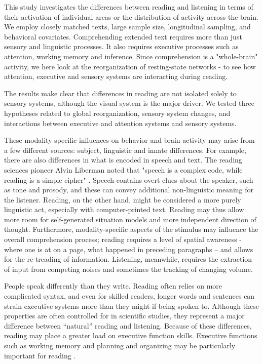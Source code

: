 This study investigates the differences between reading and listening in terms of their activation of individual areas or the distribution of activity across the brain. We employ closely matched texts, large sample size, longitudinal sampling, and behavioral covariates. Comprehending extended text requires more than just sensory and linguistic processes. It also requires executive processes such as attention, working memory and inference. Since comprehension is a "whole-brain" activity, we here look at the reorganization of resting-state networks - to see how attention, executive and sensory systems are interacting during reading.

The results make clear that differences in reading are not isolated solely to sensory systems, although the visual system is the major driver. We tested three hypotheses related to global reorganization, sensory system changes, and interactions between executive and attention systems and sensory systems.

These modality-specific influences on behavior and brain activity may arise from a few different sources: subject, linguistic and innate differences. For example, there are also differences in what is encoded in speech and text. The reading sciences pioneer Alvin Liberman noted that "speech is a complex code, while reading is a simple cipher" \cite{Mattingly1971}. Speech contains overt clues about the speaker, such as tone and prosody, and these can convey additional non-linguistic meaning for the listener. Reading, on the other hand, might be considered a more purely linguistic act, especially with computer-printed text. Reading may thus allow more room for self-generated situation models and more independent direction of thought. Furthermore, modality-specific aspects of the stimulus may influence the overall comprehension process; reading requires a level of spatial awareness -where one is at on a page, what happened in preceding paragraphs – and allows for the re-treading of information. Listening, meanwhile, requires the extraction of input from competing noises and sometimes the tracking of changing volume. 

People speak differently than they write. Reading often relies on more complicated syntax, and even for skilled readers, longer words and sentences can strain executive systems more than they might if being spoken to. Although these properties are often controlled for in scientific studies, they represent a major difference between “natural” reading and listening. Because of these differences, reading may place a greater load on executive function skills. Executive functions such as working memory and planning and organizing may be particularly important for reading \citep{Cain2006}.  

